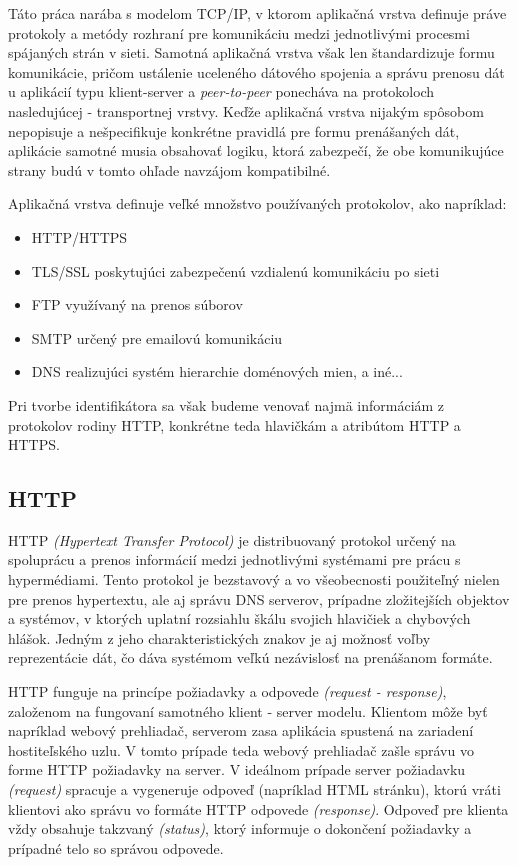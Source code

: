 \documentclass[
  digital, %
  table,   %
  lof,     %
  nolot,   %
  nocover
]{fithesis3}
\begin{document}
Táto práca narába s modelom TCP/IP, v ktorom aplikačná vrstva definuje práve
protokoly a metódy rozhraní pre komunikáciu medzi jednotlivými procesmi
spájaných strán v sieti. Samotná aplikačná vrstva však len štandardizuje formu
komunikácie, pričom ustálenie uceleného dátového spojenia a správu prenosu dát
u aplikácií typu klient-server a \textit{peer-to-peer} ponecháva na protokoloch
nasledujúcej - transportnej vrstvy. Keďže aplikačná vrstva nijakým spôsobom
nepopisuje a nešpecifikuje konkrétne pravidlá pre formu prenášaných dát,
aplikácie samotné musia obsahovať logiku, ktorá zabezpečí, že obe komunikujúce
strany budú v tomto ohľade navzájom kompatibilné.

Aplikačná vrstva definuje veľké množstvo používaných protokolov, ako napríklad:
\begin{itemize}
	\item HTTP/HTTPS
	\item TLS/SSL poskytujúci zabezpečenú vzdialenú komunikáciu po sieti
	\item FTP využívaný na prenos súborov
	\item SMTP určený pre emailovú komunikáciu
	\item DNS realizujúci systém hierarchie doménových mien, a iné...
\end{itemize}
Pri tvorbe identifikátora sa však budeme venovať najmä informáciám z protokolov
rodiny HTTP, konkrétne teda hlavičkám a atribútom HTTP a HTTPS.

\subsection{HTTP}
HTTP \textit{(Hypertext Transfer Protocol)} je distribuovaný protokol určený
na spoluprácu a prenos informácií medzi jednotlivými systémami pre
prácu s hypermédiami. Tento protokol je bezstavový a vo všeobecnosti
použiteľný nielen pre prenos hypertextu, ale aj správu DNS serverov, prípadne
zložitejších objektov a systémov, v ktorých uplatní rozsiahlu škálu svojich
hlavičiek a chybových hlášok. Jedným z jeho charakteristických znakov je aj
možnosť voľby reprezentácie dát, čo dáva systémom veľkú nezávislosť na
prenášanom formáte.

HTTP funguje na princípe požiadavky a odpovede \textit{(request - response)},
založenom na fungovaní samotného klient - server modelu. Klientom môže byť
napríklad webový prehliadač, serverom zasa aplikácia spustená na zariadení
hostiteľského uzlu. V tomto prípade teda webový prehliadač zašle správu vo
forme HTTP požiadavky na server. V ideálnom prípade server požiadavku
\textit{(request)} spracuje a vygeneruje odpoveď (napríklad HTML stránku),
ktorú vráti klientovi ako správu vo formáte HTTP odpovede \textit{(response)}.
Odpoveď pre klienta vždy obsahuje takzvaný \textit{(status)}, ktorý informuje o
dokončení požiadavky a prípadné telo so správou odpovede.
\end{document}
